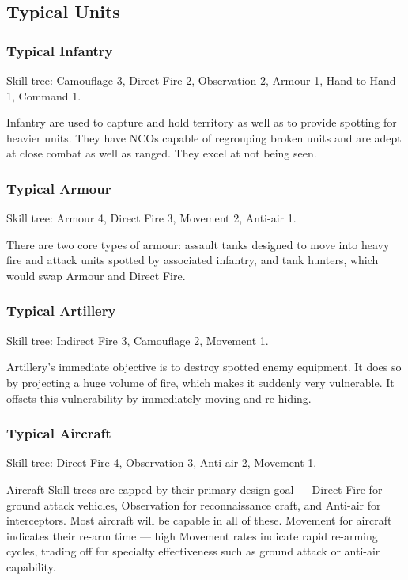 \iflandscape{}{\vfil}
\subsection{Typical Units}
\label{sec:typical-units}



\vfil

\subsubsection{Typical Infantry}

Skill tree: Camouflage 3, Direct Fire 2, Observation 2, Armour 1, Hand to-Hand 1, Command 1.

Infantry are used to capture and hold territory as well as to provide spotting for heavier units.  They have NCOs capable of regrouping broken units and are adept at close combat as well as ranged. They excel at not being seen.

\subsubsection{Typical Armour}

Skill tree: Armour 4, Direct Fire 3, Movement 2, Anti-air 1.

There are two core types of armour: assault tanks designed to move into heavy fire and attack units spotted by associated infantry, and tank hunters, which would swap Armour and Direct Fire.

\vfil

\subsubsection{Typical Artillery}

Skill tree: Indirect Fire 3, Camouflage 2, Movement 1.

Artillery's immediate objective is to destroy spotted enemy equipment. It does so by projecting a huge volume of fire, which makes it suddenly very vulnerable. It offsets this vulnerability by immediately moving and re-hiding.

\subsubsection{Typical Aircraft}

Skill tree: Direct Fire 4, Observation 3, Anti-air 2, Movement 1.

Aircraft Skill trees are capped by their primary design goal --- Direct Fire for ground attack vehicles, Observation for reconnaissance craft, and Anti-air for interceptors. Most aircraft will be capable in all of these. Movement for aircraft indicates their re-arm time --- high Movement rates indicate rapid re-arming cycles, trading off for specialty effectiveness such as ground attack or anti-air capability.
